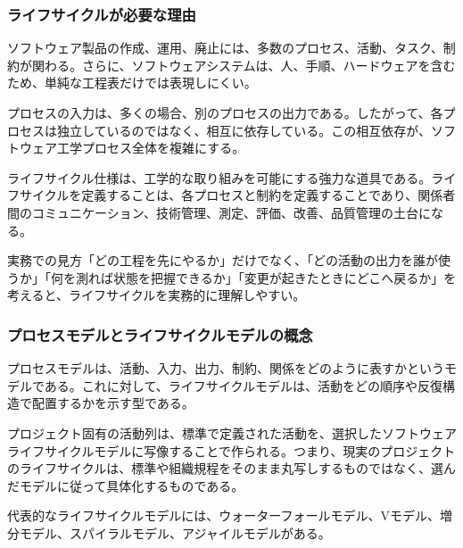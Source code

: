 \subsubsection{ライフサイクルが必要な理由}
ソフトウェア製品の作成、運用、廃止には、多数のプロセス、活動、タスク、制約が関わる。さらに、ソフトウェアシステムは、人、手順、ハードウェアを含むため、単純な工程表だけでは表現しにくい。

プロセスの入力は、多くの場合、別のプロセスの出力である。したがって、各プロセスは独立しているのではなく、相互に依存している。この相互依存が、ソフトウェア工学プロセス全体を複雑にする。

ライフサイクル仕様は、工学的な取り組みを可能にする強力な道具である。ライフサイクルを定義することは、各プロセスと制約を定義することであり、関係者間のコミュニケーション、技術管理、測定、評価、改善、品質管理の土台になる。

\begin{pointbox}{実務での見方}「どの工程を先にやるか」だけでなく、「どの活動の出力を誰が使うか」「何を測れば状態を把握できるか」「変更が起きたときにどこへ戻るか」を考えると、ライフサイクルを実務的に理解しやすい。\end{pointbox}
\subsubsection{プロセスモデルとライフサイクルモデルの概念}
プロセスモデルは、活動、入力、出力、制約、関係をどのように表すかというモデルである。これに対して、ライフサイクルモデルは、活動をどの順序や反復構造で配置するかを示す型である。

プロジェクト固有の活動列は、標準で定義された活動を、選択したソフトウェアライフサイクルモデルに写像することで作られる。つまり、現実のプロジェクトのライフサイクルは、標準や組織規程をそのまま丸写しするものではなく、選んだモデルに従って具体化するものである。

代表的なライフサイクルモデルには、ウォーターフォールモデル、Vモデル、増分モデル、スパイラルモデル、アジャイルモデルがある。

